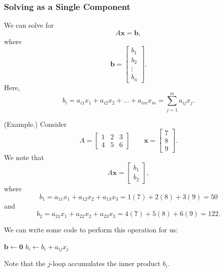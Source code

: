 \documentclass[letterpaper]{article}
\newcommand{\0}{\mathbf{0}}
\begin{document}
\subsubsection{Solving as a Single Component}
We can solve for
\[A\mathbf{x} = \mathbf{b},\]
where 
\[\mathbf{b} = \begin{bmatrix}
    b_1 \\ b_2 \\ \vdots \\ b_n
\end{bmatrix}.\]
Here, 
\[b_i = a_{i1} x_1 + a_{i2} x_2 + \hdots + a_{im} x_{m} = \sum_{j = 1}^{m} a_{ij} x_j.\]

\begin{mdframed}
    (Example.) Consider
    \[A = \begin{bmatrix}
        1 & 2 & 3 \\ 
        4 & 5 & 6
    \end{bmatrix} \qquad \mathbf{x} = \begin{bmatrix}
        7 \\ 8 \\ 9
    \end{bmatrix}.\]
    We note that 
    \[A\mathbf{x} = \begin{bmatrix}
        b_1 \\ 
        b_2
    \end{bmatrix},\]
    where 
    \[b_1 = a_{11}x_1 + a_{12}x_2 + a_{13}x_3 = 1(7) + 2(8) + 3(9) = 50\]
    and 
    \[b_2 = a_{21}x_1 + a_{22}x_2 + a_{23}x_3 = 4(7) + 5(8) + 6(9) = 122.\]
\end{mdframed}
We can write some code to perform this operation for us:
\begin{algorithmic}
    \State $\mathbf{b} \gets \mathbf{0}$
            \State $b_i \gets b_i + a_{ij} x_j$
        \EndFor
    \EndFor
\end{algorithmic}
Note that the $j$-loop accumulates the inner product $b_i$. 
    
\end{document}

